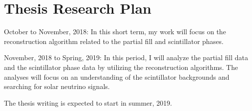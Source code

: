 \documentclass[preprint,12pt]{elsarticle}
\numberwithin{equation}{section}
\begin{document}
\section{Thesis Research Plan}
October to November, 2018: In this short term, my work will focus on the reconstruction algorithm related to the partial fill and scintillator phases. 

November, 2018 to Spring, 2019: In this period, I will analyze the partial fill data and the scintillator phase data by utilizing the reconstruction algorithms. The analyses will focus on an understanding of the scintillator backgrounds and searching for solar neutrino signals.

The thesis writing is expected to start in summer, 2019.

\vspace{30mm}

\end{document}
